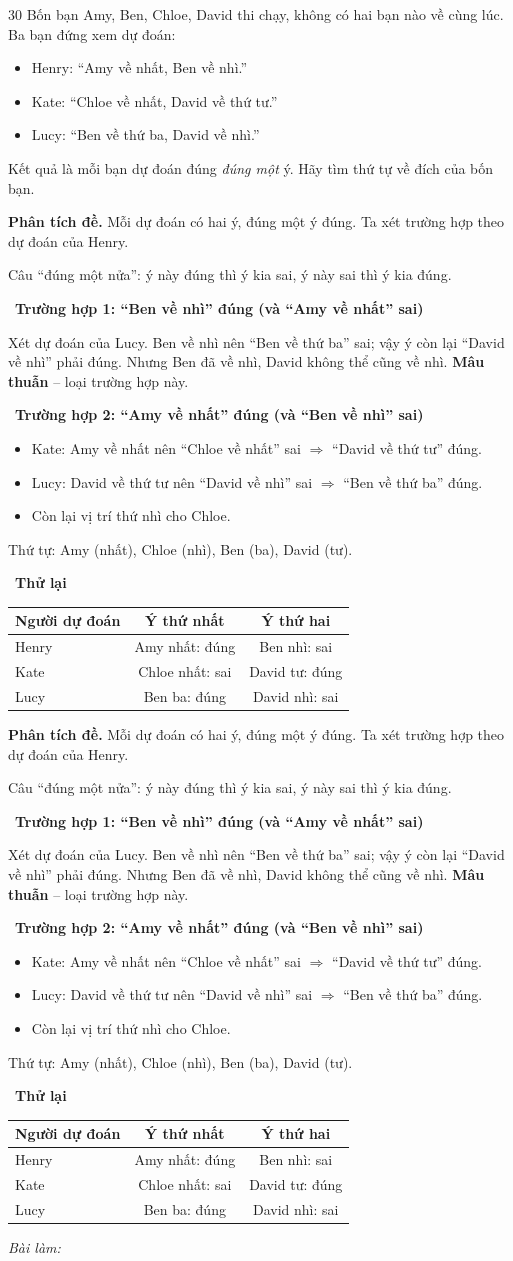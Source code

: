 \documentclass[11pt]{article}
\newif\ifsol \soltrue
\newenvironment{probbox}[2]{\begin{probboxT}{#1}{#2}}{\end{probboxT}}
\newcommand{\StuProb}[2]{\begin{probboxS}{#1}{#2}\StuProbBody\end{probboxS}}
\newcommand{\probsol}[1]{%
  \begin{lrbox}{\solmeasure}\begin{minipage}{\dimexpr\linewidth-24pt\relax}#1\end{minipage}\end{lrbox}%
  \ifsol
    \begin{solbox}#1\end{solbox}%
  \else
    \setlength{\solht}{\dimexpr\ht\solmeasure+\dp\solmeasure+0.85cm\relax}%
    \ifdim\solht<1.35cm\setlength{\solht}{1.35cm}\fi
    \ifdim\solht>\StudentMaxWork\setlength{\solht}{\StudentMaxWork}\fi
    \par\noindent\begin{minipage}{\linewidth}%
    \expandafter\StuProb\StuProbArgs
    \begin{tcolorbox}[colback=white,colframe=Line,boxrule=0.8pt,arc=5pt,
      left=8pt,right=8pt,top=4pt,bottom=4pt,height=\solht]{\footnotesize\color{Slate}\itshape\WorkWord}\end{tcolorbox}%
    \end{minipage}\par\medskip
  \fi}
\newlength{\StudentMaxWork}\setlength{\StudentMaxWork}{4.5cm}
\newcommand{\step}[2]{\par\smallskip\noindent{\bfseries\color{tmBlue!85!black}\StepWord~#1.}\ {\bfseries #2}\par\nopagebreak}
\def\WorkWord{Bài làm:}
\def\StepWord{Bước}
\begin{document}
\begin{probbox}{30}{\relax}
Bốn bạn Amy, Ben, Chloe, David thi chạy, không có hai bạn nào về cùng lúc. Ba bạn đứng xem dự đoán:
\begin{itemize}[leftmargin=1.6em,itemsep=0pt,topsep=2pt]
\item Henry: ``Amy về nhất, Ben về nhì.''
\item Kate: ``Chloe về nhất, David về thứ tư.''
\item Lucy: ``Ben về thứ ba, David về nhì.''
\end{itemize}
Kết quả là mỗi bạn dự đoán đúng \emph{đúng một} ý. Hãy tìm thứ tự về đích của bốn bạn.
\end{probbox}
\probsol{
\textbf{Phân tích đề.} Mỗi dự đoán có hai ý, đúng một ý đúng. Ta xét trường hợp theo dự đoán của Henry.
\begin{recallbox}Câu ``đúng một nửa'': ý này đúng thì ý kia sai, ý này sai thì ý kia đúng.\end{recallbox}
\step{1}{Trường hợp 1: ``Ben về nhì'' đúng (và ``Amy về nhất'' sai)}
Xét dự đoán của Lucy. Ben về nhì nên ``Ben về thứ ba'' sai; vậy ý còn lại ``David về nhì'' phải đúng. Nhưng Ben đã về nhì, David không thể
cũng về nhì. \textbf{Mâu thuẫn} -- loại trường hợp này.
\step{2}{Trường hợp 2: ``Amy về nhất'' đúng (và ``Ben về nhì'' sai)}
\begin{itemize}[leftmargin=1.4em,itemsep=1pt,topsep=1pt]
\item Kate: Amy về nhất nên ``Chloe về nhất'' sai $\Rightarrow$ ``David về thứ tư'' đúng.
\item Lucy: David về thứ tư nên ``David về nhì'' sai $\Rightarrow$ ``Ben về thứ ba'' đúng.
\item Còn lại vị trí thứ nhì cho Chloe.
\end{itemize}
Thứ tự: Amy (nhất), Chloe (nhì), Ben (ba), David (tư).
\step{3}{Thử lại}
\begin{center}
\begin{tabular}{|l|c|c|}
\hline
\rowcolor{tmBlue!10} Người dự đoán & Ý thứ nhất & Ý thứ hai \\ \hline
Henry & Amy nhất: \textcolor{tmGreen!70!black}{đúng} & Ben nhì: \textcolor{AnsRed}{sai} \\ \hline
Kate & Chloe nhất: \textcolor{AnsRed}{sai} & David tư: \textcolor{tmGreen!70!black}{đúng} \\ \hline
Lucy & Ben ba: \textcolor{tmGreen!70!black}{đúng} & David nhì: \textcolor{AnsRed}{sai} \\ \hline

\end{tabular}
\end{center}}
\end{document}
